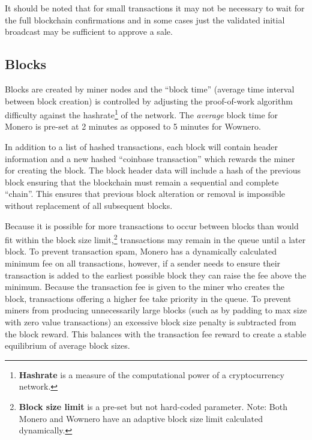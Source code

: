 It should be noted that for small transactions it may not be necessary to wait for the full blockchain confirmations and in some cases just the validated initial broadcast may be sufficient to approve a sale.

\subsection{Blocks}
Blocks are created by miner nodes and the ``block time'' (average time interval between block creation) is controlled by adjusting the proof-of-work algorithm difficulty against the hashrate\footnote{\textbf{Hashrate} is a measure of the computational power of a cryptocurrency network.} of the network\cite{randomx_repo,wikipedia_crypto}. The \emph{average} block time for Monero is pre-set at 2 minutes\cite{monero_about} as opposed to 5 minutes for Wownero\cite{wowrepo}.

In addition to a list of hashed transactions, each block will contain header information and a new hashed ``coinbase transaction'' which rewards the miner for creating the block\cite{monero_blocks, ledger_transactions}. The block header data will include a hash of the previous block ensuring that the blockchain must remain a sequential and complete ``chain''\cite{zero2monero,wikipedia_crypto}. This ensures that previous block alteration or removal is impossible without replacement of all subsequent blocks\cite{zero2monero}.

Because it is possible for more transactions to occur between blocks than would fit within the block size limit,\footnote{\textbf{Block size limit} is a pre-set but not hard-coded parameter\cite{CryptoNote}. Note: Both Monero and Wownero have an adaptive block size limit calculated dynamically\cite{monero_transactiontime}.} transactions may remain in the queue until a later block. To prevent transaction spam, Monero has a dynamically calculated minimum fee on all transactions, however, if a sender needs to ensure their transaction is added to the earliest possible block they can raise the fee above the minimum\cite{zero2monero}. Because the transaction fee is given to the miner who creates the block, transactions offering a higher fee take priority in the queue.
To prevent miners from producing unnecessarily large blocks (such as by padding to max size with zero value transactions) an excessive block size penalty is subtracted from the block reward\cite{CryptoNote}. This balances with the transaction fee reward to create a stable equilibrium of average block sizes.

